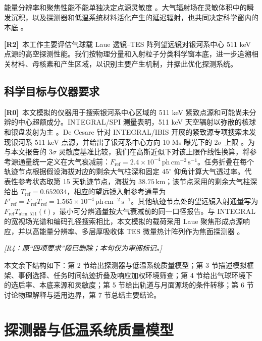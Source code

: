 \documentclass[11pt]{article}
\newcommand{\revmark}[1]{\textcolor{revisionblue}{\textbf{[R#1]}}\ }
\newcommand{\revdeleted}[1]{\par\noindent\textcolor{revisionblue}{\small\itshape [#1]}\par}
\newcommand{\phcms}{\,\mathrm{ph\,cm^{-2}\,s^{-1}}}
\newcommand{\fref}{F_{\mathrm{ref}}}
\begin{document}
能量分辨率和聚焦性能不能单独决定点源灵敏度 \cite{Shirazi2023,Hu2026}。大气辐射场在灵敏体积中的瞬发沉积，以及探测器和低温系统材料活化产生的延迟辐射，也共同决定科学窗内的本底 \cite{Gallego2025Balloon,Tian2026DIXE}。

\revmark{2}本工作主要评估气球载 Laue 透镜--TES 阵列望远镜对银河系中心 511 keV 点源的高空探测性能。我们按物理分量和入射粒子分类科学窗本底，进一步追溯相关材料、母核素和产生区域，以识别主要产生机制，并据此优化探测系统。

\subsection{科学目标与仪器要求}
\label{sec:requirements}

\begingroup
{}

\revmark{0}本文模拟的仪器用于搜索银河系中心区域的 511 keV 紧致点源和可能尚未分辨的中心超额成分。INTEGRAL/SPI 测量表明，511 keV 天空辐射以弥散的核球和银盘发射为主 \cite{Siegert2016AA,Yoneda2025}。De Cesare 针对 INTEGRAL/IBIS 开展的紧致源专项搜索未发现银河系 511 keV 点源，并给出了银河系中心方向 10 Ms 曝光下的 $2\sigma$ 上限 \cite{DeCesare2011}。为与本文报告的 $3\sigma$ 灵敏度基准比较，我们在高斯近似下对该上限作线性换算，将参考源通量统一定义在大气衰减前：$\fref=2.4\times10^{-4}\phcms$。任务折叠在每个轨迹节点根据假设海拔对应的剩余大气柱深和固定 $45^\circ$ 仰角计算大气透过率。代表性参考状态取第 15 天轨迹节点，海拔为 $38.75\,\mathrm{km}$；该节点采用的剩余大气柱深给出 $T_{\mathrm{ref}}=0.652034$，相应的望远镜入射参考通量为 $F'_{\mathrm{ref}}=\fref T_{\mathrm{ref}}=1.565\times10^{-4}\phcms$。其他轨迹节点处的望远镜入射通量写为 $\fref T_{\mathrm{atm},511}(t)$，最小可分辨通量按大气衰减前的同一口径报告。与 INTEGRAL 的宽视场光谱和编码孔径搜索相比，本文模拟的载荷采用 Laue 聚焦形成点源响应，并以高能量分辨率、多层厚吸收体 TES 微量热计阵列作为焦面探测器 \cite{Shirazi2023,Caputo2017}。

\revdeleted{R4：原“四项要求”段已删除；本句仅为审阅标记。}

本文余下结构如下：第 2 节给出探测器与低温系统质量模型；第 3 节描述模拟框架、事例选择、任务时间轨迹折叠及响应加权环境筛查；第 4 节给出气球环境下的选后率、本底来源和灵敏度；第 5 节给出轨道与月面源场的条件转移；第 6 节讨论物理解释与适用边界，第 7 节总结主要结论。

\endgroup

\section{探测器与低温系统质量模型}
\label{sec:geometry}
\end{document}
